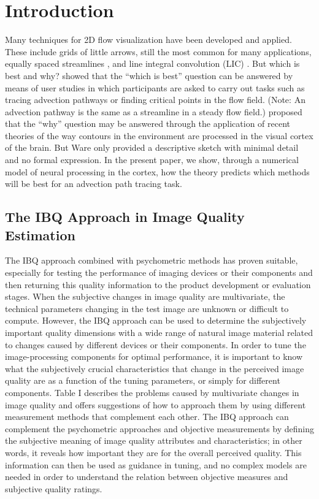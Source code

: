 \section{Introduction}

Many techniques for 2D flow visualization have been developed and
applied. These include grids of little arrows, still the most common
for many applications, equally spaced streamlines
\cite{Turk1996,Jobard1997}, and line integral convolution (LIC)
\cite{Cabral1993}. But which is best and why? 
showed that the ``which is best'' question can be answered by means
of user studies in which participants are asked to carry out tasks
such as tracing advection pathways or finding critical points in the
flow field. (Note: An advection pathway is the same as a streamline
in a steady flow field.)  proposed that the ``why''
question may be answered through the application of recent theories
of the way contours in the environment are processed in the visual
cortex of the brain. But Ware only provided a descriptive sketch
with minimal detail and no formal expression. In the present paper,
we show, through a numerical model of neural processing in the
cortex, how the theory predicts which methods will be best for an
advection path tracing task.

\subsection{The IBQ Approach in Image Quality Estimation}

The IBQ approach combined with psychometric methods has proven suitable,
especially for testing the performance of imaging devices or their
components and then returning this quality information to the product
development or evaluation stages. When the subjective changes in image
quality are multivariate, the technical parameters changing in the test
image are unknown or difficult to compute. However, the IBQ approach can be
used to determine the subjectively important quality dimensions with a wide
range of natural image material related to changes caused by different
devices or their components. In order to tune the image-processing
components for optimal performance, it is important to know what the
subjectively crucial characteristics that change in the perceived image
quality are as a function of the tuning parameters, or simply for different
components. Table I describes the problems caused by multivariate changes in
image quality and offers suggestions of how to approach them by using
different measurement methods that complement each other. The IBQ approach
can complement the psychometric approaches and objective measurements by
defining the subjective meaning of image quality attributes and
characteristics; in other words, it reveals how important they are for the
overall perceived quality. This information can then be used as guidance in
tuning, and no complex models are needed in order to understand the relation
between objective measures and subjective quality ratings.

